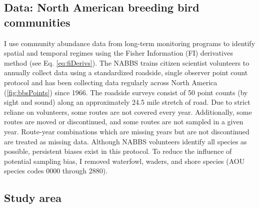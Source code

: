 \documentclass[12pt,twoside,openany]{reedthesis}
\begin{document}
\hypertarget{data-north-american-breeding-bird-communities}{%
\subsection{Data: North American breeding bird communities}\label{data-north-american-breeding-bird-communities}}

I use community abundance data from long-term monitoring programs to identify spatial and temporal regimes using the Fisher Information (FI) derivatives method (see Eq. \eqref{eq:fiDerivs}). The NABBS trains citizen scientist volunteers to annually collect data using a standardized roadside, single observer point count protocol and has been collecting data regularly across North America (\ref{fig:bbsPoints}) since 1966. The roadside surveys consist of 50 point counts (by sight and sound) along an approximately 24.5 mile stretch of road. Due to strict reliane on volunteers, some routes are not covered every year. Additionally, some routes are moved or discontinued, and some routes are not sampled in a given year. Route-year combinations which are missing years but are not discontinued are treated as missing data. Although NABBS volunteers identify all species as possible, persistent biases exist in this protocol. To reduce the influence of potential sampling bias, I removed waterfowl, waders, and shore species (AOU species codes 0000 through 2880).

\hypertarget{study-area}{%
\subsection{Study area}\label{study-area}}
\end{document}
